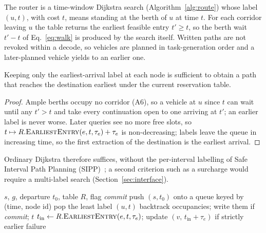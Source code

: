 The router is a time-window Dijkstra search (Algorithm~\ref{alg:route}) whose label $(u,t)$, with cost $t$, means standing at the berth of $u$ at time $t$.
For each corridor leaving $u$ the table returns the earliest feasible entry $t'\ge t$, so the berth wait $t'-t$ of Eq.~\eqref{eq:walk} is produced by the search itself.
Written paths are not revoked within a decode, so vehicles are planned in task-generation order and a later-planned vehicle yields to an earlier one.

\begin{lem}
\label{lem:label}
Keeping only the earliest-arrival label at each node is sufficient to obtain a path that reaches the destination earliest under the current reservation table.
\end{lem}

\begin{proof}
Ample berths occupy no corridor (A6), so a vehicle at $u$ since $t$ can wait until any $t'>t$ and take every continuation open to one arriving at $t'$; an earlier label is never worse.
Later queries see no more free slots, so $t\mapsto R.\textsc{EarliestEntry}(e,t,\tau_e)+\tau_e$ is non-decreasing; labels leave the queue in increasing time, so the first extraction of the destination is the earliest arrival.
\end{proof}

Ordinary Dijkstra therefore suffices, without the per-interval labelling of Safe Interval Path Planning (SIPP)~\cite{kasaura2022sipp}; a second criterion such as a surcharge would require a multi-label search (Section~\ref{sec:interface}).

\begin{algorithm}[t]
  \caption{\textsc{Route}: conflict-free planning of a single leg}
  \label{alg:route}
  \footnotesize
  \begin{algorithmic}[1]
  \Require $s$, $g$, departure $t_0$, table $R$, flag \textit{commit}
  \State push $(s,t_0)$ onto a queue keyed by (time, node id)
    \State pop the least label $(u,t)$
     \State backtrack occupancies; write them if \textit{commit}; \Return $t$ \EndIf
      \State $t_{\text{in}} \gets R.\textsc{EarliestEntry}(e,t,\tau_e)$; update $(v,\,t_{\text{in}}+\tau_e)$ if strictly earlier
    \EndFor
  \EndWhile
  \State \Return failure 
  \end{algorithmic}
\end{algorithm}

